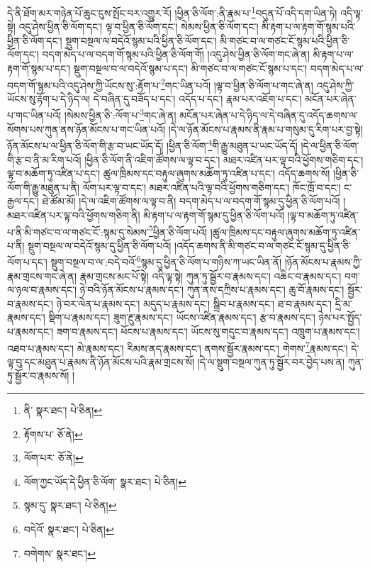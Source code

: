 དེ་ནི་ཐོག་མར་གཉེན་པོ་ཆུང་ངུས་སྤོང་བར་འགྱུར་རོ། །ཕྱིན་ཅི་ལོག་:ནི་རྣམ་པ་\footnote{ནི་  སྣར་ཐང་།  པེ་ཅིན། }བདུན་པོ་འདི་དག་ཡིན་ཏེ། འདི་ལྟ་སྟེ། འདུ་ཤེས་ཕྱིན་ཅི་ལོག་དང་། ལྟ་བ་ཕྱིན་ཅི་ལོག་དང་། སེམས་ཕྱིན་ཅི་ལོག་དང་། མི་རྟག་པ་ལ་རྟག་གོ་སྙམ་པའི་ཕྱིན་ཅི་ལོག་དང་། སྡུག་བསྔལ་ལ་བདེའོ་སྙམ་པའི་ཕྱིན་ཅི་ལོག་དང་། མི་གཙང་བ་ལ་གཙང་ངོ་སྙམ་པའི་ཕྱིན་ཅི་ལོག་དང་། བདག་མེད་པ་ལ་བདག་གོ་སྙམ་པའི་ཕྱིན་ཅི་ལོག་གོ། །འདུ་ཤེས་ཕྱིན་ཅི་ལོག་གང་ཞེ་ན། མི་རྟག་པ་ལ་རྟག་གོ་སྙམ་པ་དང་། སྡུག་བསྔལ་བ་ལ་བདེའོ་སྙམ་པ་དང་། མི་གཙང་བ་ལ་གཙང་ངོ་སྙམ་པ་དང་། བདག་མེད་པ་ལ་བདག་གོ་སྙམ་པའི་འདུ་ཤེས་ཀྱི་ཡོངས་སུ་:རྟོག་པ་\footnote{རྟོགས་པ་  ཅོ་ནེ། }གང་ཡིན་པའོ། །ལྟ་བ་ཕྱིན་ཅི་ལོག་པ་གང་ཞེ་ན། འདུ་ཤེས་ཀྱི་ཡོངས་སུ་རྟོག་པ་དེ་ཉིད་ལ། དེ་བཞིན་དུ་བཟོད་པ་དང་། འདོད་པ་དང་། རྣམ་པར་འཇོག་པ་དང་། མངོན་པར་ཞེན་པ་གང་ཡིན་པའོ། །སེམས་ཕྱིན་ཅི་:ལོག་པ་\footnote{ལོག་པར་  ཅོ་ནེ། }གང་ཞེ་ན། མངོན་པར་ཞེན་པ་དེ་ཉིད་ལ་དེ་བཞིན་དུ་འདོད་ཆགས་ལ་སོགས་པས་ཀུན་ནས་ཉོན་མོངས་པ་གང་ཡིན་པའོ། །དེ་ལ་ཉོན་མོངས་པ་རྣམས་ནི་རྣམ་པ་གསུམ་དུ་རིག་པར་བྱ་སྟེ། ཉོན་མོངས་པ་ལ་ཕྱིན་ཅི་ལོག་གི་རྩ་བ་ཡང་ཡོད་དོ། །ཕྱིན་ཅི་ལོག་\footnote{ལོག་ཀྱང་ཡོད་དེ་ཕྱིན་ཅི་ལོག་  སྣར་ཐང་།  པེ་ཅིན། }གི་རྒྱུ་མཐུན་པ་ཡང་ཡོད་དོ། །དེ་ལ་ཕྱིན་ཅི་ལོག་གི་རྩ་བ་ནི་མ་རིག་པའོ། །ཕྱིན་ཅི་ལོག་ནི་འཇིག་ཚོགས་ལ་ལྟ་བ་དང་། མཐར་འཛིན་པར་ལྟ་བའི་ཕྱོགས་གཅིག་དང་། ལྟ་བ་མཆོག་ཏུ་འཛིན་པ་དང་། ཚུལ་ཁྲིམས་དང་བརྟུལ་ཞུགས་མཆོག་ཏུ་འཛིན་པ་དང་། འདོད་ཆགས་སོ། །ཕྱིན་ཅི་ལོག་གི་རྒྱུ་མཐུན་པ་ནི། ལོག་པར་ལྟ་བ་དང་། མཐར་འཛིན་པའི་ལྟ་བའི་ཕྱོགས་གཅིག་དང་། ཁོང་ཁྲོ་བ་དང་། ང་རྒྱལ་དང་། ཐེ་ཚོམ་མོ། །དེ་ལ་འཇིག་ཚོགས་ལ་ལྟ་བ་ནི། བདག་མེད་པ་ལ་བདག་གོ་སྙམ་དུ་ཕྱིན་ཅི་ལོག་པའོ། །མཐར་འཛིན་པར་ལྟ་བའི་ཕྱོགས་གཅིག་ནི། མི་རྟག་པ་ལ་རྟག་གོ་སྙམ་དུ་ཕྱིན་ཅི་ལོག་པའོ། །ལྟ་བ་མཆོག་ཏུ་འཛིན་པ་ནི་མི་གཙང་བ་ལ་གཙང་ངོ་:སྙམ་དུ་སེམས་\footnote{སྙམ་དུ་  སྣར་ཐང་།  པེ་ཅིན། }ཕྱིན་ཅི་ལོག་པའོ། །ཚུལ་ཁྲིམས་དང་བརྟུལ་ཞུགས་མཆོག་ཏུ་འཛིན་པ་ནི། སྡུག་བསྔལ་ལ་བདེའོ་སྙམ་དུ་ཕྱིན་ཅི་ལོག་པའོ། །འདོད་ཆགས་ནི་མི་གཙང་བ་ལ་གཙང་ངོ་སྙམ་དུ་ཕྱིན་ཅི་ལོག་པ་དང་། སྡུག་བསྔལ་བ་ལ་:བདེ་བའོ་\footnote{བདེའོ་  སྣར་ཐང་།  པེ་ཅིན། }སྙམ་དུ་ཕྱིན་ཅི་ལོག་པ་གཉིས་ཀ་ཡང་ཡིན་ནོ། །ཉོན་མོངས་པ་རྣམས་ཀྱི་རྣམ་གྲངས་གང་ཞེ་ན། རྣམ་གྲངས་མང་པོ་སྟེ། འདི་ལྟ་སྟེ། ཀུན་ཏུ་སྦྱོར་བ་རྣམས་དང་། འཆིང་བ་རྣམས་དང་། བག་ལ་ཉལ་བ་རྣམས་དང་། ཉེ་བའི་ཉོན་མོངས་པ་རྣམས་དང་། ཀུན་ནས་དཀྲིས་པ་རྣམས་དང་། ཆུ་བོ་རྣམས་དང་། སྦྱོར་བ་རྣམས་དང་། ཉེ་བར་ལེན་པ་རྣམས་དང་། མདུད་པ་རྣམས་དང་། སྒྲིབ་པ་རྣམས་དང་། ཐ་བ་རྣམས་དང་། དྲི་མ་རྣམས་དང་། སྡིག་པ་རྣམས་དང་། ཟུག་རྔུ་རྣམས་དང་། ཡོངས་འཛིན་རྣམས་དང་། རྩ་བ་རྣམས་དང་། ཉེས་པར་སྤྱོད་པ་རྣམས་དང་། ཟག་བ་རྣམས་དང་། ཕོངས་པ་རྣམས་དང་། ཡོངས་སུ་གདུང་བ་རྣམས་དང་། འཁྲུག་པ་རྣམས་དང་། འཐབ་པ་རྣམས་དང་། མེ་རྣམས་དང་། རིམས་ནད་རྣམས་དང་། ནགས་སྦྱོར་རྣམས་དང་། གེགས་\footnote{བགེགས་  སྣར་ཐང་། }རྣམས་དང་། དེ་ལྟ་བུ་དང་མཐུན་པ་རྣམས་ནི་ཉོན་མོངས་པའི་རྣམ་གྲངས་སོ། །དེ་ལ་སྡུག་བསྔལ་ཀུན་ཏུ་སྦྱོར་བར་བྱེད་པས་ན། ཀུན་ཏུ་སྦྱོར་བ་རྣམས་སོ། །
